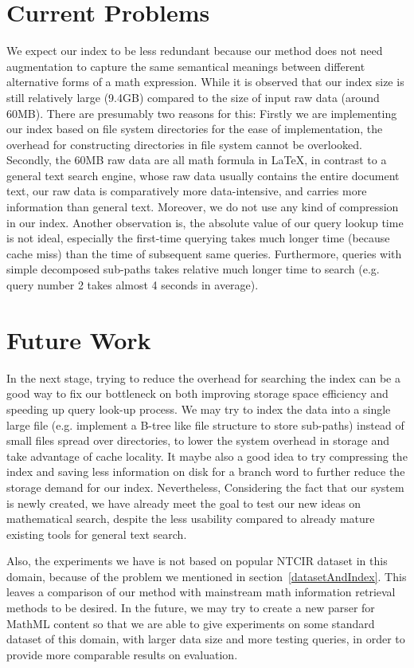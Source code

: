 \section{Current Problems}
We expect our index to be less redundant because our method does not need augmentation to capture the same semantical meanings between different alternative forms of a math expression.
While it is observed that our index size is still relatively large (9.4GB) compared to the size of input raw data (around 60MB).
There are presumably two reasons for this: 
Firstly we are implementing our index based on file system directories for the ease of implementation, the overhead for constructing directories in file system cannot be overlooked. 
Secondly, the 60MB raw data are all math formula in \LaTeX,	in contrast to a general text search engine, whose raw data usually contains the entire document text, our raw data is comparatively more data-intensive, and carries more information than general text. 
Moreover, we do not use any kind of compression in our index.
Another observation is, the absolute value of our query lookup time is not ideal, especially
the first-time querying takes much longer time (because cache miss) than the time of subsequent same queries. 
Furthermore, queries with simple decomposed sub-paths takes relative much longer time to search (e.g. query number 2 takes almost 4 seconds in average). 

\section{Future Work}
In the next stage, trying to reduce the overhead for searching the index can be a good way to fix our bottleneck on both improving storage space efficiency and speeding up query look-up process. 
We may try to index the data into a single large file (e.g. implement a B-tree like file structure to store sub-paths) instead of small files spread over directories, to lower the system overhead in storage and take advantage of cache locality. 
It maybe also a good idea to try compressing the index and saving less information on disk for a branch word to further reduce the storage demand for our index.
Nevertheless, Considering the fact that our system is newly created, we have already meet the goal to test our new ideas on mathematical search, despite the less usability compared to already mature existing tools for general text search.

Also, the experiments we have is not based on popular NTCIR dataset in this domain, because of the problem we mentioned in section~\ref{datasetAndIndex}. 
This leaves a comparison of our method with mainstream math information retrieval methods to be desired.  
In the future, we may try to create a new parser for MathML content so that we are able to give experiments on some standard dataset of this domain, with larger data size and more testing queries, in order to provide more comparable results on evaluation.

